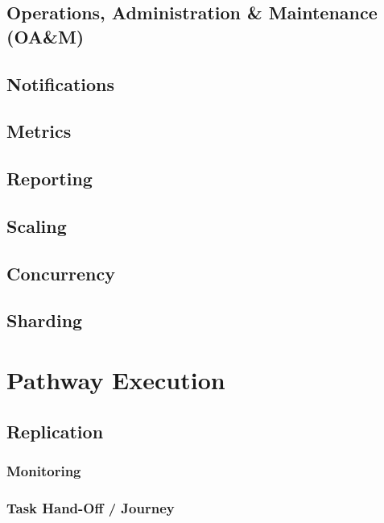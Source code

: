 \documentclass[a4paper]{book}
\begin{document}
\subsection{Operations, Administration \& Maintenance (OA\&M)}
\label{feature:petasos.oam}
\subsection{Notifications}
\label{feature:petasos.oam.notification}

\subsection{Metrics}
\label{feature:petasos.oam.metrics}

\subsection{Reporting}
\label{feature:petasos.oam.reporting}

\subsection{Scaling}
\label{feature:petasos.scaling}
\subsection{Concurrency}
\label{feature:petasos.scaling.concurrency}

\subsection{Sharding}
\label{feature:petasos.scaling.sharding}

\section{Pathway Execution}
\label{feature:petasos.pathway}

\subsection{Replication}
\label{feature:petasos.pathway.replication}
\subsubsection{Monitoring}
\label{feature:petasos.pathway.monitoring}
\subsubsection{Task Hand-Off / Journey}
\label{feature:petasos.pathway.handoff}
\end{document}

